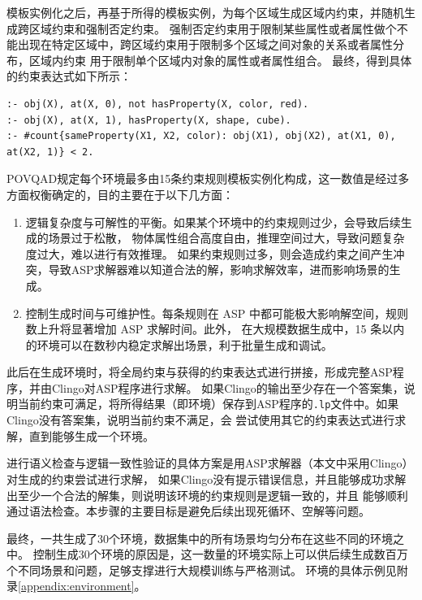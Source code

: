 模板实例化之后，再基于所得的模板实例，为每个区域生成区域内约束，并随机生成跨区域约束和强制否定约束。
强制否定约束用于限制某些属性或者属性做个不能出现在特定区域中，跨区域约束用于限制多个区域之间对象的关系或者属性分布，区域内约束
用于限制单个区域内对象的属性或者属性组合。
最终，得到具体的约束表达式如下所示：
\begin{lstlisting}
:- obj(X), at(X, 0), not hasProperty(X, color, red).
:- obj(X), at(X, 1), hasProperty(X, shape, cube).
:- #count{sameProperty(X1, X2, color): obj(X1), obj(X2), at(X1, 0), at(X2, 1)} < 2.
\end{lstlisting}

POVQAD规定每个环境最多由15条约束规则模板实例化构成，这一数值是经过多方面权衡确定的，目的主要在于以下几方面：
\begin{enumerate}[nosep]
\item 逻辑复杂度与可解性的平衡。如果某个环境中的约束规则过少，会导致后续生成的场景过于松散，
物体属性组合高度自由，推理空间过大，导致问题复杂度过大，难以进行有效推理。
如果约束规则过多，则会造成约束之间产生冲突，导致ASP求解器难以知道合法的解，影响求解效率，进而影响场景的生成。
\item 控制生成时间与可维护性。每条规则在 ASP 中都可能极大影响解空间，规则数上升将显著增加 ASP 求解时间。此外，
在大规模数据生成中，15 条以内的环境可以在数秒内稳定求解出场景，利于批量生成和调试。
\end{enumerate}

此后在生成环境时，将全局约束与获得的约束表达式进行拼接，形成完整ASP程序，并由Clingo对ASP程序进行求解。
如果Clingo的输出至少存在一个答案集，说明当前约束可满足，将所得结果（即环境）保存到ASP程序的\texttt{.lp}文件中。如果Clingo没有答案集，说明当前约束不满足，会
尝试使用其它的约束表达式进行求解，直到能够生成一个环境。

进行语义检查与逻辑一致性验证的具体方案是用ASP求解器（本文中采用Clingo）对生成的约束尝试进行求解，
如果Clingo没有提示错误信息，并且能够成功求解出至少一个合法的解集，则说明该环境的约束规则是逻辑一致的，并且
能够顺利通过语法检查。本步骤的主要目标是避免后续出现死循环、空解等问题。

最终，一共生成了30个环境，数据集中的所有场景均匀分布在这些不同的环境之中。
控制生成30个环境的原因是，这一数量的环境实际上可以供后续生成数百万个不同场景和问题，足够支撑进行大规模训练与严格测试。
环境的具体示例见附录\ref{appendix:environment}。
